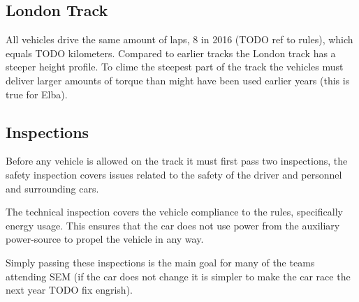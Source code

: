 \subsection{London Track}
All vehicles drive the same amount of laps, 8 in 2016 (TODO ref to rules), which equals TODO kilometers. Compared to earlier tracks the London track has a steeper height profile. To clime the steepest part of the track the vehicles must deliver larger amounts of torque than might have been used earlier years (this is true for Elba). 

\subsection{Inspections}
Before any vehicle is allowed on the track it must first pass two inspections, the safety inspection covers issues related to the safety of the driver and personnel and surrounding cars. 

The technical inspection covers the vehicle compliance to the rules, specifically energy usage. This ensures that the car does not use power from the auxiliary power-source to propel the vehicle in any way.

Simply passing these inspections is the main goal for many of the teams attending SEM (if the car does not change it is simpler to make the car race the next year TODO fix engrish).
